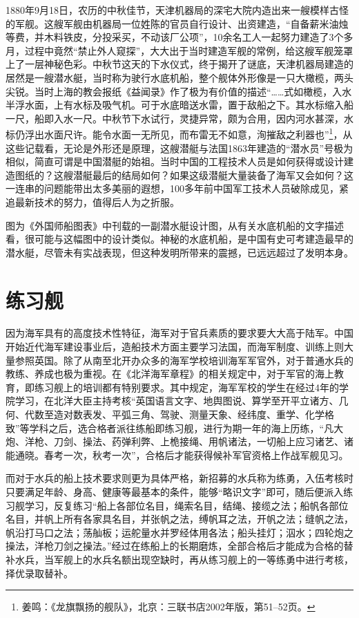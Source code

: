\documentclass[12pt,UTF8]{ctexbook}
\begin{document}
1880年9月18日，农历的中秋佳节，天津机器局的深宅大院内造出来一艘模样古怪的军舰。这艘军舰由机器局一位姓陈的官员自行设计、出资建造，“自备薪米油烛等费，并木料铁皮，分投采买，不动该厂公项”，10余名工人一起努力建造了3个多月，过程中竟然“禁止外人窥探”，大大出于当时建造军舰的常例，给这艘军舰笼罩上了一层神秘色彩。中秋节这天的下水仪式，终于揭开了谜底，天津机器局建造的居然是一艘潜水艇，当时称为驶行水底机船，整个舰体外形像是一只大橄榄，两头尖锐。当时上海的教会报纸《益闻录》作了极为有价值的描述“……式如橄榄，入水半浮水面，上有水标及吸气机。可于水底暗送水雷，置于敌船之下。其水标缩入船一尺，船即入水一尺。中秋节下水试行，灵捷异常，颇为合用，因内河水甚深，水标仍浮出水面尺许。能令水面一无所见，而布雷无不如意，洵摧敌之利器也”\footnote{姜鸣：《龙旗飘扬的舰队》，北京：三联书店2002年版，第51--52页。}，从这些记载看，无论是外形还是原理，这艘潜艇与法国1863年建造的“潜水员”号极为相似，简直可谓是中国潜艇的始祖。当时中国的工程技术人员是如何获得或设计建造图纸的？这艘潜艇最后的结局如何？如果这级潜艇大量装备了海军又会如何？这一连串的问题能带出太多美丽的遐想，100多年前中国军工技术人员破除成见，紧追最新技术的努力，值得后人为之折服。

图为《外国师船图表》中刊载的一副潜水艇设计图，从有关水底机船的文字描述看，很可能与这幅图中的设计类似。神秘的水底机船，是中国有史可考建造最早的潜水艇，尽管未有实战表现，但这种发明所带来的震撼，已远远超过了发明本身。

\section{练习舰}

因为海军具有的高度技术性特征，海军对于官兵素质的要求要大大高于陆军。中国开始近代海军建设事业后，造船技术方面主要学习法国，而海军制度、训练上则大量参照英国。除了从南至北开办众多的海军学校培训海军军官外，对于普通水兵的教练、养成也极为重视。在《北洋海军章程》的相关规定中，对于军官的海上教育，即练习舰上的培训都有特别要求。其中规定，海军军校的学生在经过4年的学院学习，在北洋大臣主持考核“英国语言文字、地舆图说、算学至开平立诸方、几何、代数至造对数表发、平弧三角、驾驶、测量天象、经纬度、重学、化学格致”等学科之后，选合格者派往练船即练习舰，进行为期一年的海上历练，“凡大炮、洋枪、刀剑、操法、药弹利弊、上桅接绳、用帆诸法，一切船上应习诸艺、诸能通晓。春考一次，秋考一次”，合格后才能获得候补军官资格上作战军舰见习。

而对于水兵的船上技术要求则更为具体严格，新招募的水兵称为练勇，入伍考核时只要满足年龄、身高、健康等最基本的条件，能够“略识文字”即可，随后便派入练习舰学习，反复练习“船上各部位名目，绳索名目，结绳、接缆之法；船帆各部位名目，并帆上所有各家具名目，并张帆之法，缚帆耳之法，开帆之法；缝帆之法，帆沿打马口之法；荡舢板；运舵量水并罗经体用各法；船头挂灯；泅水；四轮炮之操法，洋枪刀剑之操法。”经过在练船上的长期磨炼，全部合格后才能成为合格的替补水兵，当军舰上的水兵名额出现空缺时，再从练习舰上的一等练勇中进行考核，择优录取替补。
\end{document}
